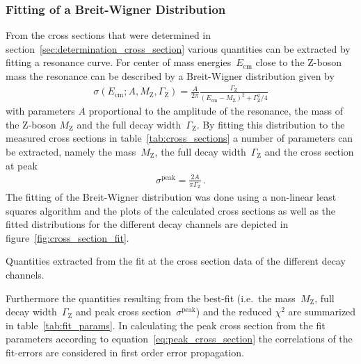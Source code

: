 \documentclass[11pt, a4paper]{article}
\numberwithin{equation}{section}
\begin{document}
\subsubsection{Fitting of a Breit-Wigner Distribution}
\label{sec:fit_resonance}
From the cross sections that were determined in section~\ref{sec:determination_cross_section} various quantities can be extracted by fitting a resonance curve.
For center of mass energies~$E_\mathrm{cm}$ close to the Z-boson mass the resonance can be described by a Breit-Wigner distribution given by
\begin{align}
	\sigma(E_\mathrm{cm}; A, M_\mathrm{Z}, \Gamma_\mathrm{Z}) = \frac{A}{2\pi} \frac{\Gamma_\mathrm{Z}}{(E_\mathrm{cm} - M_\mathrm{Z})^2 + \Gamma_\mathrm{Z}^2 / 4}
	\label{eq:breit_wigner}
\end{align}
with parameters $A$ proportional to the amplitude of the resonance, the mass of the Z-boson $M_\mathrm{Z}$ and the full decay width~$\Gamma_\mathrm{Z}$.
By fitting this distribution to the measured cross sections in table~\ref{tab:cross_sections} a number of parameters can be extracted, namely the mass~$M_\mathrm{Z}$, the full decay width~$\Gamma_\mathrm{Z}$ and the cross section at peak
\begin{align}
	\sigma^\mathrm{peak} = \frac{2A}{\pi \Gamma_\mathrm{Z}} \,\text{.}
	\label{eq:peak_cross_section}
\end{align}
The fitting of the Breit-Wigner distribution was done using a non-linear least squares algorithm \cite{lmfit} and the plots of the calculated cross sections as well as the fitted distributions for the different decay channels are depicted in figure~\ref{fig:cross_section_fit}.
\begin{table}[h]
	\centering
	
	\caption{Quantities extracted from the fit at the cross section data of the different decay channels.}
	\label{tab:fit_params}
\end{table}
Furthermore the quantities resulting from the best-fit (i.e.\ the mass~$M_\mathrm{Z}$, full decay width~$\Gamma_\mathrm{Z}$ and peak cross section~$\sigma^\mathrm{peak}$) and the reduced $\chi^2$ are summarized in table~\ref{tab:fit_params}.
In calculating the peak cross section from the fit parameters according to equation~\eqref{eq:peak_cross_section} the correlations of the fit-errors are considered in first order error propagation.
\end{document}
